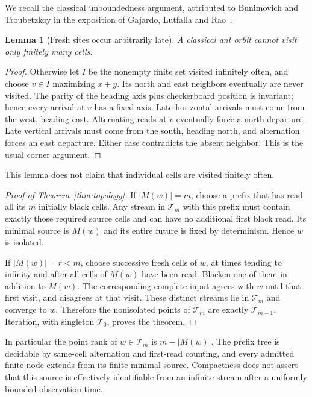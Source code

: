 \documentclass[11pt]{article}
\newtheorem{lemma}[theorem]{Lemma}
\theoremstyle{definition}\newtheorem{definition}[theorem]{Definition}
\theoremstyle{remark}\newtheorem{remark}[theorem]{Remark}
\newcommand{\Tr}{\mathcal T}
\begin{document}
We recall the classical unboundedness argument, attributed to Bunimovich and
Troubetzkoy in the exposition of Gajardo, Lutfalla and Rao~\cite[Section~2]{highway}.
\begin{lemma}[Fresh sites occur arbitrarily late]\label{lem:fresh}
A classical ant orbit cannot visit only finitely many cells.
\end{lemma}
\begin{proof}
Otherwise let $I$ be the nonempty finite set visited infinitely often, and
choose $v\in I$ maximizing $x+y$. Its north and east neighbors eventually
are never visited. The parity of the heading axis plus checkerboard position
is invariant; hence every arrival at $v$ has a fixed axis. Late horizontal
arrivals must come from the west, heading east. Alternating reads at $v$
eventually force a north departure. Late vertical arrivals must come from
the south, heading north, and alternation forces an east departure. Either
case contradicts the absent neighbor. This is the usual corner argument.
\end{proof}
This lemma does not claim that individual cells are visited finitely often.

\begin{proof}[Proof of Theorem~\ref{thm:topology}]
If $|M(w)|=m$, choose a prefix that has read all its $m$ initially black cells.
Any stream in $\Tr_m$ with this prefix must contain exactly those required
source cells and can have no additional first black read. Its minimal source
is $M(w)$ and its entire future is fixed by determinism. Hence $w$ is isolated.

If $|M(w)|=r<m$, choose successive fresh cells of $w$, at times tending to
infinity and after all cells of $M(w)$ have been read. Blacken one of them in
addition to $M(w)$. The corresponding complete input agrees with $w$ until
that first visit, and disagrees at that visit. These distinct streams lie in
$\Tr_m$ and converge to $w$. Therefore the nonisolated points of $\Tr_m$ are
exactly $\Tr_{m-1}$. Iteration, with singleton $\Tr_0$, proves the theorem.
\end{proof}
In particular the point rank of $w\in\Tr_m$ is $m-|M(w)|$.
The prefix tree is decidable by same-cell alternation and first-read counting,
and every admitted finite node extends from its finite minimal source.
Compactness does not assert that this source is effectively identifiable from
an infinite stream after a uniformly bounded observation time.
\end{document}
